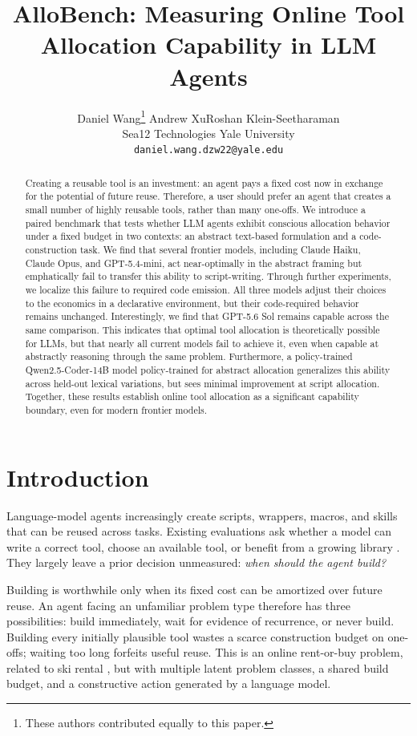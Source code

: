 \documentclass{article}
\title{AlloBench: Measuring Online Tool Allocation Capability in LLM Agents}
\author{%
Daniel Wang\thanks{These authors contributed equally to this paper.} \quad
Andrew Xu\footnotemark[1] \quad Roshan Klein-Seetharaman \\
Sea12 Technologies \quad Yale University \\
\texttt{daniel.wang.dzw22@yale.edu}}
\begin{document}
\maketitle
\begin{abstract}
Creating a reusable tool is an investment: an agent pays a fixed cost now in
exchange for the potential of future reuse. Therefore, a user should prefer an agent that creates a small number of highly reusable tools, rather than many one-offs. We introduce a paired benchmark that tests
whether LLM agents exhibit conscious allocation behavior under a fixed budget in two contexts: an abstract text-based formulation and a code-construction task. We find that several frontier models, including Claude Haiku, Claude Opus, and GPT-5.4-mini, act near-optimally in the abstract framing but emphatically fail to transfer this ability to script-writing. Through further experiments, we
localize this failure to required code emission. All three models adjust their choices to the economics in a declarative environment, but their code-required behavior remains unchanged. Interestingly, we find that
GPT-5.6 Sol remains capable across the same comparison. This indicates that optimal tool allocation is theoretically possible for LLMs, but that nearly all current models fail to achieve it, even when capable at abstractly reasoning through the same problem.
Furthermore, a policy-trained Qwen2.5-Coder-14B model policy-trained for abstract allocation generalizes this ability across held-out lexical
variations, but sees minimal improvement at script allocation.
Together, these results establish online tool allocation as a significant
capability boundary, even for modern frontier models.
\end{abstract}

\section{Introduction}

Language-model agents increasingly create scripts, wrappers, macros, and skills
that can be reused across tasks. Existing evaluations ask whether a model can
write a correct tool, choose an available tool, or benefit from a growing
library \cite{cai2024latm,qian2023creator,huang2024ultratool,qu2025toollearningsurvey}.
They largely leave a prior decision unmeasured: \emph{when should the agent
build?}

Building is worthwhile only when its fixed cost can be amortized over future
reuse. An agent facing an unfamiliar problem type therefore has three
possibilities: build immediately, wait for evidence of recurrence, or never
build. Building every initially plausible tool wastes a scarce construction
budget on one-offs; waiting too long forfeits useful reuse. This is an online
rent-or-buy problem, related to ski rental \cite{karlin1994competitive}, but
with multiple latent problem classes, a shared build budget, and a constructive
action generated by a language model.
\end{document}
